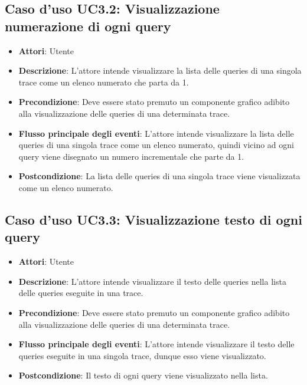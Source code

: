 \subsection{Caso d'uso UC3.2: Visualizzazione numerazione di ogni query}
\begin{itemize}
\item \textbf{Attori}: Utente
\item \textbf{Descrizione}: L'attore intende visualizzare la lista delle queries di una singola trace come un elenco numerato che parta da 1.
\item \textbf{Precondizione}: Deve essere stato premuto un componente grafico adibito alla visualizzazione delle queries di una determinata trace.
\item \textbf{Flusso principale degli eventi}: L'attore intende visualizzare la lista delle queries di una singola trace come un elenco numerato, quindi vicino ad ogni query viene disegnato un numero incrementale che parte da 1.
\item \textbf{Postcondizione}: La lista delle queries di una singola trace viene visualizzata come un elenco numerato.
\end{itemize}
\subsection{Caso d'uso UC3.3: Visualizzazione testo di ogni query}
\begin{itemize}
\item \textbf{Attori}: Utente
\item \textbf{Descrizione}: L'attore intende visualizzare il testo delle queries nella lista delle queries eseguite in una trace.
\item \textbf{Precondizione}: Deve essere stato premuto un componente grafico adibito alla visualizzazione delle queries di una determinata trace.
\item \textbf{Flusso principale degli eventi}: L'attore intende visualizzare il testo delle queries eseguite in una singola trace, dunque esso viene visualizzato.
\item \textbf{Postcondizione}: Il testo di ogni query viene visualizzato nella lista.
\end{itemize}
